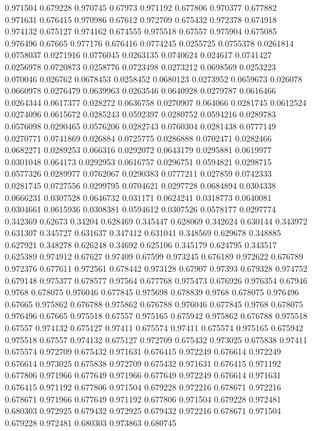 0.971504 0.679228
0.970745 0.67973
0.971192 0.677806
0.970377 0.677882
0.971631 0.676415
0.970986 0.67612
0.972709 0.675432
0.972378 0.674918
0.974132 0.675127
0.974162 0.674555
0.975518 0.67557
0.975904 0.675085
0.976496 0.67665
0.977176 0.676416
0.0774245 0.0255725
0.0755378 0.0261814
0.0758037 0.0271916
0.0776045 0.0263135
0.0740624 0.024617
0.0741427 0.0256978
0.0720873 0.0258776
0.0723498 0.0273212
0.0698569 0.0253223
0.070046 0.026762
0.0678453 0.0258452
0.0680123 0.0273952
0.0659673 0.026078
0.0660978 0.0276479
0.0639963 0.0263546
0.0640928 0.0279787
0.0616466 0.0264344
0.0617377 0.028272
0.0636758 0.0270907
0.064066 0.0281745
0.0612524 0.0274096
0.0615672 0.0285243
0.0592397 0.0280752
0.0594216 0.0289783
0.0576098 0.0290465
0.0576206 0.0282743
0.0760304 0.0281438
0.0777149 0.0270771
0.0741869 0.026884
0.0725775 0.0286888
0.0702471 0.0282466
0.0682271 0.0289253
0.066316 0.0292072
0.0643179 0.0295881
0.0619977 0.0301048
0.064173 0.0292953
0.0616757 0.0296751
0.0594821 0.0298715
0.0577326 0.0289977
0.0762067 0.0290383
0.0777211 0.027859
0.0742333 0.0281745
0.0727556 0.0299795
0.0704621 0.0297728
0.0684894 0.0304338
0.0666231 0.0307528
0.0646732 0.031171
0.0624241 0.0318773
0.0640081 0.0304661
0.0615936 0.0308381
0.0594612 0.0307526
0.0578177 0.0297774
0.342369 0.62673
0.34204 0.628469
0.345447 0.628069
0.342624 0.630144
0.343972 0.631307
0.345727 0.631637
0.347412 0.631041
0.348569 0.629678
0.348885 0.627921
0.348278 0.626248
0.34692 0.625106
0.345179 0.624795
0.343517 0.625389
0.974912 0.67627
0.97409 0.67599
0.973245 0.676189
0.972622 0.676789
0.972376 0.677611
0.972561 0.678442
0.973128 0.67907
0.97393 0.679328
0.974752 0.679148
0.975377 0.678577
0.97564 0.677768
0.975473 0.676926
0.976354 0.67946
0.9768 0.678075
0.976046 0.677845
0.975698 0.678839
0.9768 0.678075
0.976496 0.67665
0.975862 0.676788
0.975862 0.676788
0.976046 0.677845
0.9768 0.678075
0.976496 0.67665
0.975518 0.67557
0.975165 0.675942
0.975862 0.676788
0.975518 0.67557
0.974132 0.675127
0.97411 0.675574
0.97411 0.675574
0.975165 0.675942
0.975518 0.67557
0.974132 0.675127
0.972709 0.675432
0.973025 0.675838
0.97411 0.675574
0.972709 0.675432
0.971631 0.676415
0.972249 0.676614
0.972249 0.676614
0.973025 0.675838
0.972709 0.675432
0.971631 0.676415
0.971192 0.677806
0.971966 0.677649
0.971966 0.677649
0.972249 0.676614
0.971631 0.676415
0.971192 0.677806
0.971504 0.679228
0.972216 0.678671
0.972216 0.678671
0.971966 0.677649
0.971192 0.677806
0.971504 0.679228
0.972481 0.680303
0.972925 0.679432
0.972925 0.679432
0.972216 0.678671
0.971504 0.679228
0.972481 0.680303
0.973863 0.680745
